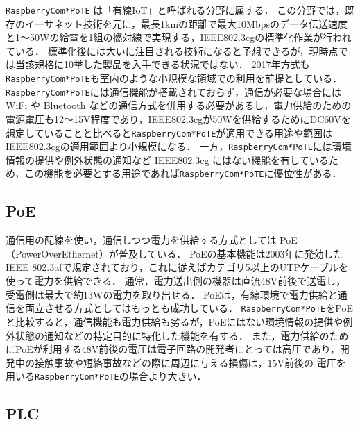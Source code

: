 {\tt Raspberry\-Com*PoTE} は「有線IoT」と呼ばれる分野に属する．
この分野では，既存のイーサネット技術を元に，最長1kmの距離で最大10Mbpsのデータ伝送速度と1〜50Wの給電を1組の撚対線で実現する，IEEE802.3cgの標準化作業が行われている．
標準化後には大いに注目される技術になると予想できるが，現時点では当該規格に10挙した製品を入手できる状況ではない．
2017年方式も{\tt Raspberry\-Com*PoTE}も室内のような小規模な領域での利用を前提としている．
{\tt Raspberry\-Com*PoTE}には通信機能が搭載されておらず，通信が必要な場合には WiFi や Bluetooth などの通信方式を併用する必要があるし，電力供給のための電源電圧も12〜15V程度であり，IEEE802.3cgが50Wを供給するためにDC60Vを想定していることと比べると{\tt Raspberry\-Com*PoTE}が適用できる用途や範囲はIEEE802.3cgの適用範囲より小規模になる．
一方，{\tt Raspberry\-Com*PoTE}には環境情報の提供や例外状態の通知など IEEE802.3cg にはない機能を有しているため，この機能を必要とする用途であれば{\tt Raspberry\-Com*PoTE}に優位性がある．




\subsection{PoE}
\vspace{-0.5zh}

通信用の配線を使い，通信しつつ電力を供給する方式としては PoE（PowerOverEthernet）が普及している．
PoEの基本機能は2003年に発効したIEEE 802.3afで規定されており，これに従えばカテゴリ5以上のUTPケーブルを使って電力を供給できる．
通常，電力送出側の機器は直流48V前後で送電し，受電側は最大で約13Wの電力を取り出せる．
PoEは，有線環境で電力供給と通信を両立させる方式としてはもっとも成功している．
{\tt Raspberry\-Com*PoTE}をPoEと比較すると，通信機能も電力供給も劣るが，PoEにはない環境情報の提供や例外状態の通知などの特定目的に特化した機能を有する．
また，電力供給のためにPoEが利用する48V前後の電圧は電子回路の開発者にとっては高圧であり，開発中の接触事故や短絡事故などの際に周辺に与える損傷は，15V前後の
電圧を用いる{\tt Raspberry\-Com*PoTE}の場合より大きい．


\subsection{PLC}
\vspace{-0.5zh}

